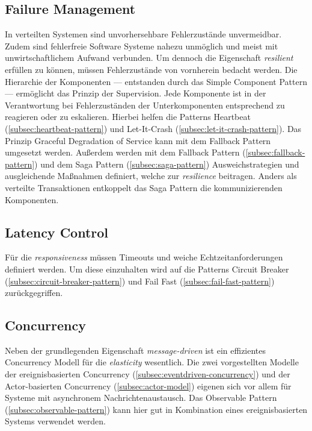 \subsection{Failure Management}
In verteilten Systemen sind unvorhersehbare Fehlerzustände unvermeidbar. Zudem sind fehlerfreie Software Systeme nahezu unmöglich und meist mit unwirtschaftlichem Aufwand verbunden. Um dennoch die Eigenschaft \textit{resilient} erfüllen zu können, müssen Fehlerzustände von vornherein bedacht werden. Die Hierarchie der Komponenten --- entstanden durch das Simple Component Pattern --- ermöglicht das Prinzip der Supervision. Jede Komponente ist in der Verantwortung bei Fehlerzuständen der Unterkomponenten entsprechend zu reagieren oder zu eskalieren. Hierbei helfen die Patterns Heartbeat (\ref{subsec:heartbeat-pattern}) und Let-It-Crash (\ref{subsec:let-it-crash-pattern}). Das Prinzip Graceful Degradation of Service kann mit dem Fallback Pattern umgesetzt werden. Außerdem werden mit dem Fallback Pattern (\ref{subsec:fallback-pattern}) und dem Saga Pattern (\ref{subsec:saga-pattern}) Ausweichstrategien und ausgleichende Maßnahmen definiert, welche zur \textit{resilience} beitragen. Anders als verteilte Transaktionen entkoppelt das Saga Pattern die kommunizierenden Komponenten.

\subsection{Latency Control}
Für die \textit{responsiveness} müssen Timeouts und weiche Echtzeitanforderungen definiert werden. Um diese einzuhalten wird auf die Patterns Circuit Breaker (\ref{subsec:circuit-breaker-pattern}) und Fail Fast (\ref{subsec:fail-fast-pattern}) zurückgegriffen. 

\subsection{Concurrency}
Neben der grundlegenden Eigenschaft \textit{message-driven} ist ein effizientes Concurrency Modell für die \textit{elasticity} wesentlich. Die zwei vorgestellten Modelle der ereignisbasierten Concurrency (\ref{subsec:eventdriven-concurrency}) und der Actor-basierten Concurrency (\ref{subsec:actor-model}) eigenen sich vor allem für Systeme mit asynchronem Nachrichtenaustausch. Das Observable Pattern (\ref{subsec:observable-pattern}) kann hier gut in Kombination eines ereignisbasierten Systems verwendet werden.

\vspace{7.5cm}

